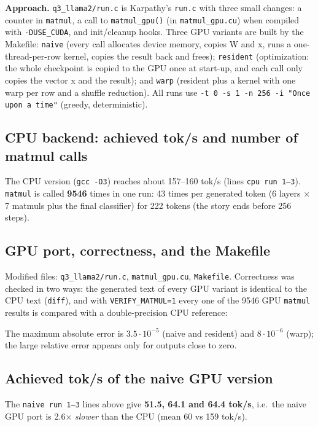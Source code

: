 \documentclass[11pt,a4paper]{article}
\begin{document}
\textbf{Approach.} \texttt{q3\_llama2/run.c} is Karpathy's \texttt{run.c} with three small changes: a counter in
\texttt{matmul}, a call to \texttt{matmul\_gpu()} (in \texttt{matmul\_gpu.cu}) when compiled with \texttt{-DUSE\_CUDA},
and init/cleanup hooks. Three GPU variants are built by the Makefile: \texttt{naive} (every call allocates device
memory, copies W and x, runs a one-thread-per-row kernel, copies the result back and frees); \texttt{resident}
(optimization: the whole checkpoint is copied to the GPU once at start-up, and each call only copies the vector x
and the result); and \texttt{warp} (resident plus a kernel with one warp per row and a shuffle reduction).
All runs use \texttt{-t 0 -s 1 -n 256 -i "Once upon a time"} (greedy, deterministic).

\subsection{CPU backend: achieved tok/s and number of matmul calls}

The CPU version (\texttt{gcc -O3}) reaches about 157--160 tok/s (lines \texttt{cpu run 1--3}). \texttt{matmul} is
called \textbf{9546} times in one run: 43 times per generated token (6 layers $\times$ 7 matmuls plus the final
classifier) for 222 tokens (the story ends before 256 steps).

\subsection{GPU port, correctness, and the Makefile}
Modified files: \texttt{q3\_llama2/run.c}, \texttt{matmul\_gpu.cu}, \texttt{Makefile}. Correctness was checked in two ways:
the generated text of every GPU variant is identical to the CPU text (\texttt{diff}), and with
\texttt{VERIFY\_MATMUL=1} every one of the 9546 GPU \texttt{matmul} results is compared with a double-precision CPU
reference:

The maximum absolute error is $3.5\cdot10^{-5}$ (naive and resident) and $8\cdot10^{-6}$ (warp); the large relative
error appears only for outputs close to zero.

\subsection{Achieved tok/s of the naive GPU version}
The \texttt{naive run 1--3} lines above give \textbf{51.5, 64.1 and 64.4 tok/s}, i.e.\ the naive GPU port is
2.6$\times$ \emph{slower} than the CPU (mean 60 vs 159 tok/s).
\end{document}
